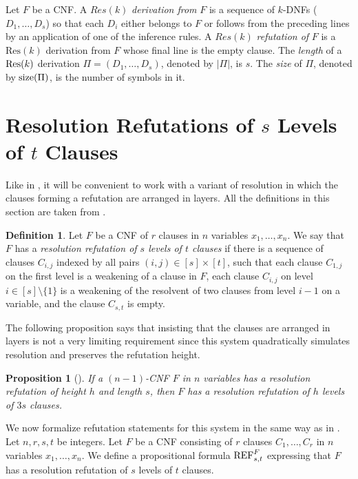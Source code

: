 \documentclass[10pt,a4paper]{article}
\newtheorem{proposition}[theorem]{Proposition}
\theoremstyle{remark}
\newtheorem*{switching lemma}{Switching Lemma}
\newtheorem*{open problem}{Open Problem}
\theoremstyle{definition}
\newtheorem{definition}[theorem]{Definition}
\begin{document}
\noindent Let $F$ be a CNF. A $\textit{Res}(k)$ \emph{derivation from} $F$ is a sequence of $k$-DNFs ($D_1,\ldots, D_s$) so that each $D_i$ either belongs to $F$ or follows from the preceding lines by an application of one of the inference rules. A $\textit{Res}(k)$ \emph{refutation of} $F$ is a $\text{Res}(k)$ derivation from $F$ whose final line is the empty clause. The \emph{length} of a $\textnormal{Res}(k)$ derivation $\Pi = (D_1,\ldots, D_s)$, denoted by $|\Pi|$, is $s$. The \emph{size} of $\Pi$, denoted by $\textnormal{size}(\Pi)$, is the number of symbols in it. 





\section{Resolution Refutations of $\textit{s}$ Levels of $\textit{t}$ Clauses}
\label{sec:res-refut-of-s-t-definition}
Like in \cite{Garlik2019-mfcs}, it will be convenient to work with a variant of resolution in  which the clauses forming a refutation are arranged in layers. All the definitions in this section are taken from \cite{Garlik2019-mfcs}.

\begin{definition}
 Let $F$ be a CNF of $r$ clauses in $n$ variables $x_1, \ldots, x_n$.  We say that $F$ has a \emph{resolution refutation of $s$ levels of $t$ clauses} if there is a sequence of clauses $C_{i,j}$ indexed by all pairs $(i,j) \in [s] \times [t]$, such that each clause $C_{1,j}$ on the first level is a weakening of a clause in $F$, each clause $C_{i,j}$ on level $i \! \in \! [s] \! \setminus \! \{1\}$ is a weakening of the resolvent of two clauses from level $i-1$ on a variable, and the clause $C_{s,t}$ is empty. 
\end{definition}

The following proposition says that insisting that the clauses are arranged in layers is not a very limiting requirement since this system quadratically simulates resolution and preserves the refutation height.

\begin{proposition}[\cite{Garlik2019-mfcs}]
\label{proposition:simulation-of-Res}
If a $(n-1)$-CNF $F$ in $n$ variables has a resolution refutation of height $h$ and length $s$, then $F$ has a resolution refutation of $h$ levels of $3s$ clauses. 
\end{proposition}

We now formalize refutation statements for this system in the same way as in \cite{Garlik2019-mfcs}. 
Let $n,r,s,t$ be integers. Let $F$ be a CNF consisting of $r$ clauses $C_1, \ldots , C_r$ in $n$ variables $x_1, \ldots , x_n$. We define a propositional formula $\textnormal{REF}^{F}_{s,t}$ expressing that $F$ has a resolution refutation of $s$ levels of $t$ clauses.
\end{document}
